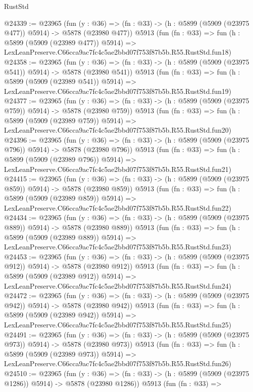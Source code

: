 \begin{lexlean}{RustStd}
\begin{coremodule}
{{@24339 := @23965
    (fun (y : @36) => (fn : @33) -> (h : @5899 (@5909 (@23975 @477)) @5914) -> @5878 (@23980 @477))
    @5913
    (fun (fn : @33) =>
    fun (h : @5899 (@5909 (@23989 @477)) @5914) =>
    LexLeanPreserve.C66cca9ac7fc4c5ae2bbd07f753f87b5b.R55.RustStd.fun18)
@24358 := @23965
    (fun (y : @36) => (fn : @33) -> (h : @5899 (@5909 (@23975 @541)) @5914) -> @5878 (@23980 @541))
    @5913
    (fun (fn : @33) =>
    fun (h : @5899 (@5909 (@23989 @541)) @5914) =>
    LexLeanPreserve.C66cca9ac7fc4c5ae2bbd07f753f87b5b.R55.RustStd.fun19)
@24377 := @23965
    (fun (y : @36) => (fn : @33) -> (h : @5899 (@5909 (@23975 @759)) @5914) -> @5878 (@23980 @759))
    @5913
    (fun (fn : @33) =>
    fun (h : @5899 (@5909 (@23989 @759)) @5914) =>
    LexLeanPreserve.C66cca9ac7fc4c5ae2bbd07f753f87b5b.R55.RustStd.fun20)
@24396 := @23965
    (fun (y : @36) => (fn : @33) -> (h : @5899 (@5909 (@23975 @796)) @5914) -> @5878 (@23980 @796))
    @5913
    (fun (fn : @33) =>
    fun (h : @5899 (@5909 (@23989 @796)) @5914) =>
    LexLeanPreserve.C66cca9ac7fc4c5ae2bbd07f753f87b5b.R55.RustStd.fun21)
@24415 := @23965
    (fun (y : @36) => (fn : @33) -> (h : @5899 (@5909 (@23975 @859)) @5914) -> @5878 (@23980 @859))
    @5913
    (fun (fn : @33) =>
    fun (h : @5899 (@5909 (@23989 @859)) @5914) =>
    LexLeanPreserve.C66cca9ac7fc4c5ae2bbd07f753f87b5b.R55.RustStd.fun22)
@24434 := @23965
    (fun (y : @36) => (fn : @33) -> (h : @5899 (@5909 (@23975 @889)) @5914) -> @5878 (@23980 @889))
    @5913
    (fun (fn : @33) =>
    fun (h : @5899 (@5909 (@23989 @889)) @5914) =>
    LexLeanPreserve.C66cca9ac7fc4c5ae2bbd07f753f87b5b.R55.RustStd.fun23)
@24453 := @23965
    (fun (y : @36) => (fn : @33) -> (h : @5899 (@5909 (@23975 @912)) @5914) -> @5878 (@23980 @912))
    @5913
    (fun (fn : @33) =>
    fun (h : @5899 (@5909 (@23989 @912)) @5914) =>
    LexLeanPreserve.C66cca9ac7fc4c5ae2bbd07f753f87b5b.R55.RustStd.fun24)
@24472 := @23965
    (fun (y : @36) => (fn : @33) -> (h : @5899 (@5909 (@23975 @942)) @5914) -> @5878 (@23980 @942))
    @5913
    (fun (fn : @33) =>
    fun (h : @5899 (@5909 (@23989 @942)) @5914) =>
    LexLeanPreserve.C66cca9ac7fc4c5ae2bbd07f753f87b5b.R55.RustStd.fun25)
@24491 := @23965
    (fun (y : @36) => (fn : @33) -> (h : @5899 (@5909 (@23975 @973)) @5914) -> @5878 (@23980 @973))
    @5913
    (fun (fn : @33) =>
    fun (h : @5899 (@5909 (@23989 @973)) @5914) =>
    LexLeanPreserve.C66cca9ac7fc4c5ae2bbd07f753f87b5b.R55.RustStd.fun26)
@24510 := @23965
    (fun (y : @36) =>
    (fn : @33) -> (h : @5899 (@5909 (@23975 @1286)) @5914) -> @5878 (@23980 @1286))
    @5913
    (fun (fn : @33) =>
}}
\end{coremodule}
\end{lexlean}
